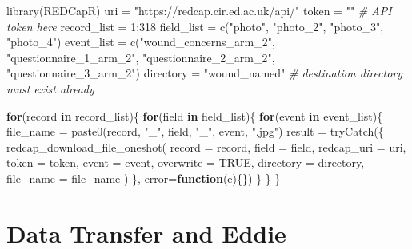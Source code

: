 \documentclass[
]{book}
\newenvironment{Shaded}{\begin{snugshade}}{\end{snugshade}}
\newcommand{\AttributeTok}[1]{\textcolor[rgb]{0.77,0.63,0.00}{#1}}
\newcommand{\CommentTok}[1]{\textcolor[rgb]{0.56,0.35,0.01}{\textit{#1}}}
\newcommand{\ConstantTok}[1]{\textcolor[rgb]{0.00,0.00,0.00}{#1}}
\newcommand{\ControlFlowTok}[1]{\textcolor[rgb]{0.13,0.29,0.53}{\textbf{#1}}}
\newcommand{\DecValTok}[1]{\textcolor[rgb]{0.00,0.00,0.81}{#1}}
\newcommand{\FunctionTok}[1]{\textcolor[rgb]{0.00,0.00,0.00}{#1}}
\newcommand{\NormalTok}[1]{#1}
\newcommand{\OtherTok}[1]{\textcolor[rgb]{0.56,0.35,0.01}{#1}}
\newcommand{\SpecialCharTok}[1]{\textcolor[rgb]{0.00,0.00,0.00}{#1}}
\newcommand{\StringTok}[1]{\textcolor[rgb]{0.31,0.60,0.02}{#1}}
\begin{document}
\begin{Shaded}
\begin{Highlighting}[]
\FunctionTok{library}\NormalTok{(REDCapR)}
\NormalTok{uri }\OtherTok{=} \StringTok{"https://redcap.cir.ed.ac.uk/api/"}
\NormalTok{token }\OtherTok{=} \StringTok{""} \CommentTok{\# API token here}
\NormalTok{record\_list }\OtherTok{=} \DecValTok{1}\SpecialCharTok{:}\DecValTok{318}
\NormalTok{field\_list }\OtherTok{=} \FunctionTok{c}\NormalTok{(}\StringTok{"photo"}\NormalTok{, }\StringTok{"photo\_2"}\NormalTok{, }\StringTok{"photo\_3"}\NormalTok{, }\StringTok{"photo\_4"}\NormalTok{)}
\NormalTok{event\_list }\OtherTok{=} \FunctionTok{c}\NormalTok{(}\StringTok{"wound\_concerns\_arm\_2"}\NormalTok{, }\StringTok{"questionnaire\_1\_arm\_2"}\NormalTok{,}
               \StringTok{"questionnaire\_2\_arm\_2"}\NormalTok{, }\StringTok{"questionnaire\_3\_arm\_2"}\NormalTok{)}
\NormalTok{directory }\OtherTok{=} \StringTok{"wound\_named"} \CommentTok{\# destination directory must exist already}

\ControlFlowTok{for}\NormalTok{(record }\ControlFlowTok{in}\NormalTok{ record\_list)\{}
  \ControlFlowTok{for}\NormalTok{(field }\ControlFlowTok{in}\NormalTok{ field\_list)\{}
    \ControlFlowTok{for}\NormalTok{(event }\ControlFlowTok{in}\NormalTok{ event\_list)\{}
\NormalTok{      file\_name }\OtherTok{=} \FunctionTok{paste0}\NormalTok{(record, }\StringTok{"\_"}\NormalTok{, field, }\StringTok{"\_"}\NormalTok{, event, }\StringTok{".jpg"}\NormalTok{)}
\NormalTok{      result }\OtherTok{=} 
        \FunctionTok{tryCatch}\NormalTok{(\{}
          \FunctionTok{redcap\_download\_file\_oneshot}\NormalTok{(}
            \AttributeTok{record        =}\NormalTok{ record,}
            \AttributeTok{field         =}\NormalTok{ field,}
            \AttributeTok{redcap\_uri    =}\NormalTok{ uri,}
            \AttributeTok{token         =}\NormalTok{ token,}
            \AttributeTok{event         =}\NormalTok{ event,}
            \AttributeTok{overwrite     =} \ConstantTok{TRUE}\NormalTok{,}
            \AttributeTok{directory     =}\NormalTok{ directory,}
            \AttributeTok{file\_name     =}\NormalTok{ file\_name}
\NormalTok{          )}
\NormalTok{        \}, }\AttributeTok{error=}\ControlFlowTok{function}\NormalTok{(e)\{\})}
\NormalTok{    \}}
\NormalTok{  \}}
\NormalTok{\}}
\end{Highlighting}
\end{Shaded}

\hypertarget{data-transfer-and-eddie}{%
\chapter{Data Transfer and Eddie}\label{data-transfer-and-eddie}}
\end{document}
